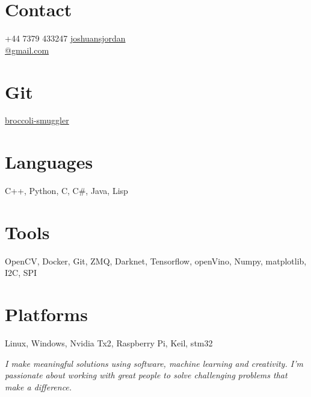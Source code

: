\documentclass[print]{friggeri-cv} %
\begin{document}

\begin{aside} %
\section{Contact}
+44 7379 433247
\href{mailto:joshuansjordan@gmail.com}{joshuansjordan\\@gmail.com}
\section{Git}
\href{https://github.com/broccoli-smuggler}{broccoli-smuggler}
\section{Languages}
C++, Python, C, C\#, Java, Lisp
\section{Tools}
OpenCV, Docker, Git, ZMQ, Darknet, Tensorflow, openVino, Numpy, matplotlib, I2C, SPI
\section{Platforms}
Linux, Windows, Nvidia Tx2, Raspberry Pi, Keil, stm32
\end{aside}

\emph{I make meaningful solutions using software, machine learning and creativity. I'm passionate about working with great people to solve challenging problems that make a difference.}
\end{document}
